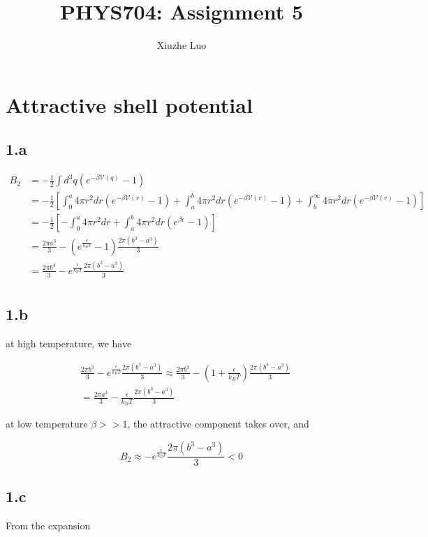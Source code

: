 \documentclass{article}
\title{PHYS704: Assignment 5}
\author{Xiuzhe Luo}
\date{}
\begin{document}
\maketitle

\section*{Attractive shell potential}
\subsection*{1.a}

$$
\begin{aligned}
    B_2 &= -\frac{1}{2}\int d^3q (e^{-\beta \mathcal{V}(q)} - 1)\\
    &= -\frac{1}{2}[\int_{0}^a 4\pi r^2 dr (e^{-\beta \mathcal{V}(r)} - 1) + \int_{a}^{b} 4\pi r^2 dr (e^{-\beta \mathcal{V}(r)} - 1)
        + \int_{b}^{\infty} 4\pi r^2 dr (e^{-\beta \mathcal{V}(r)} - 1)]\\
    &= -\frac{1}{2}[-\int_{0}^a 4\pi r^2 dr + \int_{a}^{b} 4\pi r^2 dr (e^{\beta \epsilon} - 1)]\\
    &= \frac{2\pi a^3}{3} - (e^{\frac{\epsilon}{k_B T}} - 1) \frac{2\pi (b^3 - a^3)}{3}\\
    &= \frac{2\pi b^3}{3} - e^{\frac{\epsilon}{k_B T}} \frac{2\pi (b^3 - a^3)}{3}\\
\end{aligned}
$$

\subsection*{1.b}
at high temperature, we have

$$
\begin{aligned}
    &\frac{2\pi b^3}{3} - e^{\frac{\epsilon}{k_B T}} \frac{2\pi (b^3 - a^3)}{3} \approx \frac{2\pi b^3}{3} - (1 + \frac{\epsilon}{k_B T}) \frac{2\pi (b^3 - a^3)}{3}\\
    &= \frac{2\pi a^3}{3} - \frac{\epsilon}{k_B T} \frac{2\pi (b^3 - a^3)}{3}
\end{aligned}
$$

at low temperature $\beta >> 1$, the attractive component takes over, and

$$
B_2 \approx - e^{\frac{\epsilon}{k_B T}} \frac{2\pi (b^3 - a^3)}{3} < 0
$$

\subsection*{1.c}
From the expansion
\end{document}
